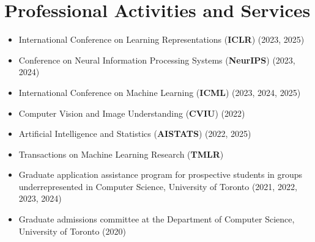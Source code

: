\section*{Professional Activities and Services}
\vspace{\postsubhead}
\begin{adjustwidth}{\indentleft}{\indentright}
  \begin{itemize}
    \item International Conference on Learning Representations (\textbf{ICLR}) (2023, 2025)
    \item Conference on Neural Information Processing Systems  (\textbf{NeurIPS}) (2023, 2024)
    \item International Conference on Machine Learning (\textbf{ICML}) (2023, 2024, 2025)
    \item Computer Vision and Image Understanding (\textbf{CVIU}) (2022)
    \item Artificial Intelligence and Statistics (\textbf{AISTATS}) (2022, 2025)
    \item Transactions on Machine Learning Research (\textbf{TMLR}) 
    \item Graduate application assistance program for prospective students in groups underrepresented in Computer Science, University of Toronto (2021, 2022, 2023, 2024)
    \item Graduate admissions committee at the Department of Computer Science, University of Toronto (2020)
    
  \end{itemize}
\end{adjustwidth}
